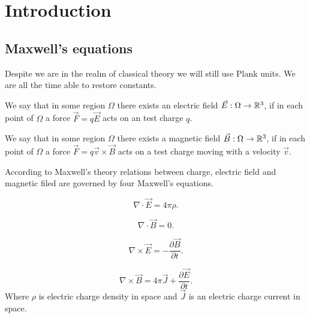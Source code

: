\documentclass[main.tex]{subfiles}
\begin{document}
\section{Introduction}
\subsection{Maxwell's equations}
Despite we are in the realm of classical theory we will still use Plank units. We are all the time able to restore constants.
\begin{definition}
We say that in some region $\Omega$ there exists an electric field $\vec{E}:\Omega\to\mathbb{R}^3$, if in each point of $\Omega$ a force $\vec{F} = q\vec{E}$ acts on an test charge $q$.  
\end{definition}

\begin{definition}
We say that in some region $\Omega$ there exists a magnetic field $\vec{B}:\Omega\to\mathbb{R}^3$, if in each point of $\Omega$ a force $\vec{F} = q\vec{v} \times \vec{B}$ acts on a test charge moving with a velocity $\vec{v}$.
\end{definition}

According to Maxwell's theory relations between charge, electric field and magnetic filed are governed by four Maxwell's equations.

\begin{equation}
\nabla \cdot \vec{E} = 4 \pi \rho.
\end{equation}

\begin{equation}
\label{maxwell-div}
\nabla \cdot \vec{B} = 0.
\end{equation}

\begin{equation}
\nabla \times \vec{E} = -\frac{\partial \vec{B}} {\partial t}.
\end{equation}

\begin{equation}
\nabla \times \vec{B} = 4 \pi \vec{J} + \frac{\partial \vec{E}} {\partial t}.
\end{equation}
Where $\rho$ is electric charge density in space and $\vec{J}$ is an electric charge current in space.
\end{document}
